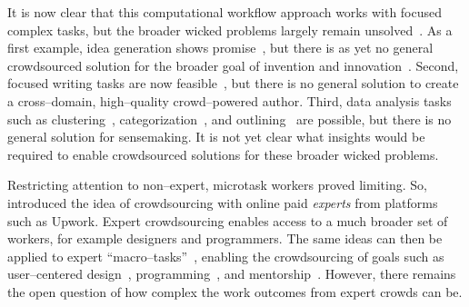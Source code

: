 \documentclass[trackingWork]{subfiles}
\begin{document}
It is now clear that this computational workflow approach works with focused complex tasks, but
the broader wicked problems largely remain unsolved~\cite{rittel1973dilemmas}.
As a first example,
idea generation shows promise~\cite{YuEncouragingOutside,yu2014distributed,Yu2016a},
but there is as yet no general crowdsourced solution for
the broader goal of invention and innovation~\cite{fuge2014analysis}.
Second,
focused writing tasks are now feasible~\cite{Kim2017,bernsteinSoylent,Nebeling:2016:WCW:2858036.2858169,writingMicroTasks,agapie2015crowdsourcing}, but
there is no general solution to create
a cross--domain, high--quality crowd--powered author. 
Third,
data analysis tasks such as
clustering~\cite{chilton2013cascade},
categorization~\cite{andre2014crowd}, and
outlining~\cite{luther2015crowdlines}
are possible, but there is no general solution for sensemaking.
It is not yet clear what insights would be required
to enable crowdsourced solutions for these broader wicked problems.


Restricting attention to non--expert, microtask workers proved limiting.
So, \citeauthor{foundry} introduced the idea of crowdsourcing with
online paid \textit{experts} from platforms such as Upwork.
Expert crowdsourcing enables access to a much broader set of workers,
for example designers and programmers.
The same ideas can then be applied to expert ``macro--tasks''~\cite{cheng2015break,haas2015argonaut}, enabling the crowdsourcing of goals such as user--centered design~\cite{foundry},
programming~\cite{latoza2014microtask,Fast2016,Chen2016}, and
mentorship~\cite{suzukiAtelier}.
However, there remains the open question of
how complex the work outcomes from expert crowds can be.

\onlyinsubfile{\newpage}
\subsubsection{\pieceworkpers}

\begin{comment}
- Farm workers-->textile
- Limit: human management and oversight
- Evaluation
- Skilled work harder
- Only some organizations can use it
- Management practices
\end{comment}
\end{document}
